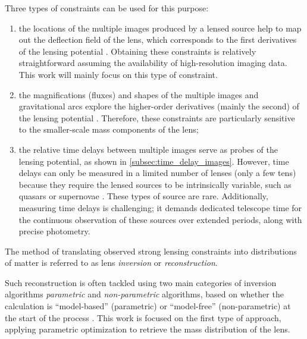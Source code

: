 Three types of constraints can be used for this purpose:
\begin{enumerate}
    \item the locations of the multiple images produced by a lensed source help to map out the deflection field of the lens, which corresponds to the first derivatives of the lensing potential \citep{cardone_gravitational_2001}. Obtaining these constraints is relatively straightforward assuming the availability of high-resolution imaging data. This work will mainly focus on this type of constraint.
    \item the magnifications (fluxes) and shapes of the multiple images and gravitational arcs explore the higher-order derivatives (mainly the second) of the lensing potential \citep{gilman_probing_2019}. Therefore, these constraints are particularly sensitive to the smaller-scale mass components of the lens;
    \item the relative time delays between multiple images serve as probes of the lensing potential, as shown in \cref{subsec:time_delay_images}. However, time delays can only be measured in a limited number of lenses (only a few tens) because they require the lensed sources to be intrinsically variable, such as quasars or supernovae \citep{refsdal_possibility_1964}. These types of source are rare. Additionally, measuring time delays is challenging; it demands dedicated telescope time for the continuous observation of these sources over extended periods, along with precise photometry.
\end{enumerate}

The method of translating observed strong lensing constraints into distributions of matter is referred to as lens \emph{inversion} or \emph{reconstruction}.

Such reconstruction is often tackled using two main categories of inversion algorithms \emph{parametric} and \emph{non-parametric} algorithms, based on whether the calculation is ``model-based'' (parametric) or ``model-free'' (non-parametric) at the start of the process \citep{coe_lensperfect_2008}. This work is focused on the first type of approach, applying parametric optimization to retrieve the mass distribution of the lens.

